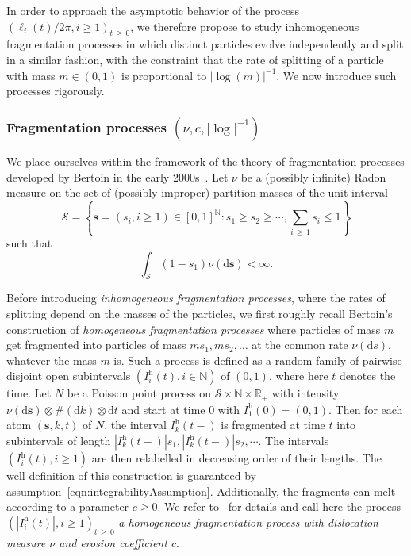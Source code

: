 \documentclass[AHL,Unicode,longabstracts,published]{cedram}
\newcommand{\N}{\mathbb{N}}
\newcommand{\R}{\mathbb{R}}
\newcommand{\h}{\mathrm{h}}
\newcommand{\dd}{\mathrm{d}}
\newcommand{\calS}{\mathcal{S}}
\newcommand{\bfs}{\mathbf{s}}
\begin{document}
In order to approach the asymptotic behavior of the process $(\ell_i(t)/2\pi, i \geq 1)_{t\,\geq\,0}$, we therefore propose to study inhomogeneous fragmentation processes in which distinct particles evolve independently and split in a similar fashion, with the constraint that the rate of splitting of a particle with mass $m \in (0,1)$ is proportional to $|\log(m)|^{-1}$. We now introduce such processes rigorously.


\subsubsection{Fragmentation processes $(\nu,c,|\log|^{-1})$}
We place ourselves within the framework of the theory of fragmentation processes developed by Bertoin in the early 2000s~\cite{BertoinHom, BertoinSSF, BertoinAB03}. Let $\nu$ be a (possibly infinite) Radon measure on the set of (possibly improper) partition masses of the unit interval
\[
\calS = \left\{ \bfs = \left(s_i, i \geq 1\right) \in [0,1]^\N : s_1 \geq s_2 \geq \cdots, \sum_{i \,\geq\,1} s_i \leq 1 \right\}
\]
such that
\begin{equation}\label{eqn:integrabilityAssumption}
\int_{\calS }(1- s_1) \nu(\dd \bfs) < \infty.
\end{equation}

Before introducing \emph{inhomogeneous fragmentation processes}, where the rates of splitting depend on the masses of the particles, we first roughly recall Bertoin's construction of \emph{homogeneous fragmentation processes} where particles of mass $m$ get fragmented into particles of mass $ms_1,ms_2,\ldots$ at the common rate $\nu(\dd s)$, whatever the mass $m$ is. Such a process is defined as a random family of pairwise disjoint open subintervals $(I^\h_i(t), i \in \N)$ of $(0,1)$, where here $t$ denotes the time. Let $N$ be a Poisson point process on $\calS \times \N \times \R_+$ with intensity $\nu(\dd \bfs) \otimes\#(\dd k) \otimes\dd t$ and start at time $0$ with $I^\h_1(0) = (0,1)$. Then for each atom $(\bfs,k,t)$ of $N$, the interval $I^\h_{k}(t-)$ is fragmented at time $t$ into subintervals of length $|I^\h_k(t-)|s_1,|I^\h_k(t-)|s_2,\cdots$. The intervals $(I^\h_i(t), i \geq 1)$ are then relabelled in decreasing order of their lengths. The well-definition of this construction is guaranteed by assumption~\eqref{eqn:integrabilityAssumption}. Additionally, the fragments can melt according to a parameter $c \geq 0$. We refer to~\cite{BertoinHom, BertoinSSF} for details and call here the process $(|I^\h_i(t)|, i \geq 1)_{t \,\geq\,0}$ \emph{a homogeneous fragmentation process with dislocation measure $\nu$ and erosion coefficient $c$}.
\end{document}
